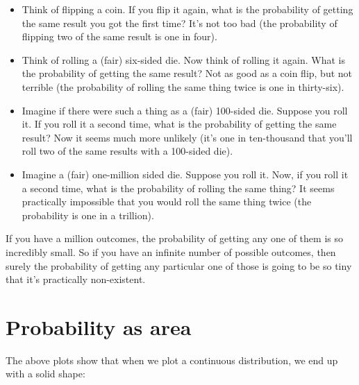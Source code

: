 \documentclass[../../../main.tex]{subfiles}
\begin{document}
\begin{itemize}
  \item Think of flipping a coin. If you flip it again, what is the probability of getting the same result you got the first time? It's not too bad (the probability of flipping two of the same result is one in four).
  \item Think of rolling a (fair) six-sided die. Now think of rolling it again. What is the probability of getting the same result? Not as good as a coin flip, but not terrible (the probability of rolling the same thing twice is one in thirty-six).
  \item Imagine if there were such a thing as a (fair) 100-sided die. Suppose you roll it. If you roll it a second time, what is the probability of getting the same result? Now it seems much more unlikely (it's one in ten-thousand that you'll roll two of the same results with a 100-sided die).
  \item Imagine a (fair) one-million sided die. Suppose you roll it. Now, if you roll it a second time, what is the probability of rolling the same thing? It seems practically impossible that you would roll the same thing twice (the probability is one in a trillion). 
\end{itemize}

\noindent
If you have a million outcomes, the probability of getting any one of them is so incredibly small. So if you have an infinite number of possible outcomes, then surely the probability of getting any particular one of those is going to be so tiny that it's practically non-existent.


\section{Probability as area}

The above plots show that when we plot a continuous distribution, we end up with a solid shape:

\begin{center}
\end{center}
\end{document}

